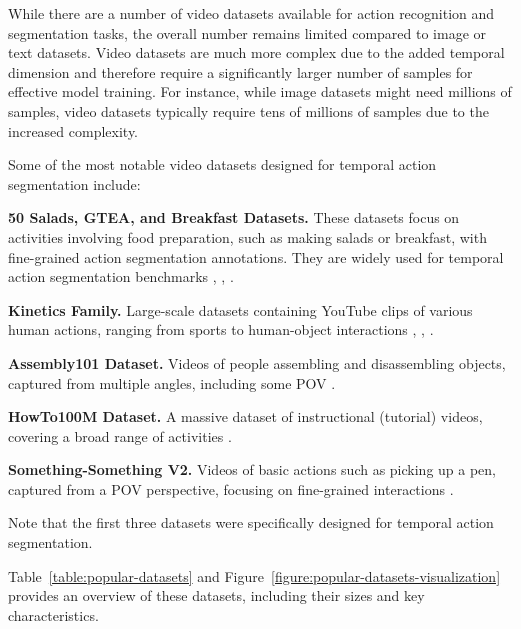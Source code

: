 While there are a number of video datasets available for action recognition and segmentation tasks, the overall number remains limited compared to image or text datasets. Video datasets are much more complex due to the added temporal dimension and therefore require a significantly larger number of samples for effective model training. For instance, while image datasets might need millions of samples, video datasets typically require tens of millions of samples due to the increased complexity.

Some of the most notable video datasets designed for temporal action segmentation include:

\noindent\textbf{50 Salads, GTEA, and Breakfast Datasets.} These datasets focus on activities involving food preparation, such as making salads or breakfast, with fine-grained action segmentation annotations. They are widely used for temporal action segmentation benchmarks \cite{50-salads-dataset}, \cite{gtea-dataset}, \cite{breakfasts-dataset}.

\noindent\textbf{Kinetics Family.} Large-scale datasets containing YouTube clips of various human actions, ranging from sports to human-object interactions \cite{kinetics-400-dataset}, \cite{kinetics-600-dataset}, \cite{kinetics-700-dataset}.

\noindent\textbf{Assembly101 Dataset.} Videos of people assembling and disassembling objects, captured from multiple angles, including some POV \cite{assembly101-dataset}.

\noindent\textbf{HowTo100M Dataset.} A massive dataset of instructional (tutorial) videos, covering a broad range of activities \cite{howto100m-dataset}.

\noindent\textbf{Something-Something V2.} Videos of basic actions such as picking up a pen, captured from a POV perspective, focusing on fine-grained interactions \cite{something-something-dataset}.

Note that the first three datasets were specifically designed for temporal action segmentation.



Table~\ref{table:popular-datasets} and Figure~\ref{figure:popular-datasets-visualization} provides an overview of these datasets, including their sizes and key characteristics.